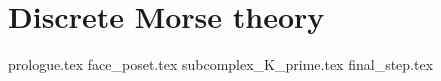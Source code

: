 \documentclass[class=article, crop=false]{standalone}
\begin{document}
\chapter{Discrete Morse theory}
\label{chap:dmt}

{prologue.tex}
{face_poset.tex}
{subcomplex_K_prime.tex}
{final_step.tex}
\end{document}
